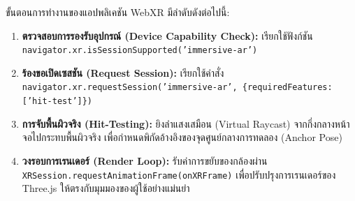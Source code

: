 ขั้นตอนการทำงานของแอปพลิเคชัน WebXR มีลำดับดังต่อไปนี้:
\begin{enumerate}
    \item \textbf{ตรวจสอบการรองรับอุปกรณ์ (Device Capability Check):} เรียกใช้ฟังก์ชัน \\
    \texttt{navigator.xr.isSessionSupported('immersive-ar')}
    \item \textbf{ร้องขอเปิดเซสชัน (Request Session):} เรียกใช้คำสั่ง \\
    \texttt{navigator.xr.requestSession('immersive-ar', \{requiredFeatures: ['hit-test']\})}
    \item \textbf{การจับพื้นผิวจริง (Hit-Testing):} ยิงลำแสงเสมือน (Virtual Raycast) จากกึ่งกลางหน้าจอไปกระทบพื้นผิวจริง เพื่อกำหนดพิกัดอ้างอิงของจุดศูนย์กลางการทดลอง (Anchor Pose)
    \item \textbf{วงรอบการเรนเดอร์ (Render Loop):} รับค่าการขยับของกล้องผ่าน \\
    \texttt{XRSession.requestAnimationFrame(onXRFrame)} เพื่อปรับปรุงการเรนเดอร์ของ Three.js ให้ตรงกับมุมมองของผู้ใช้อย่างแม่นยำ
\end{enumerate}

